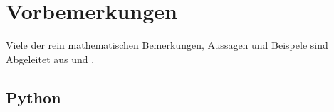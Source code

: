 \chapter{Vorbemerkungen}

Viele der rein mathematischen Bemerkungen, Aussagen und Beispele sind Abgeleitet aus \cite{merziger2024repetitorium} und \cite{gollmann2017mathematik}. 

\section{Python}
